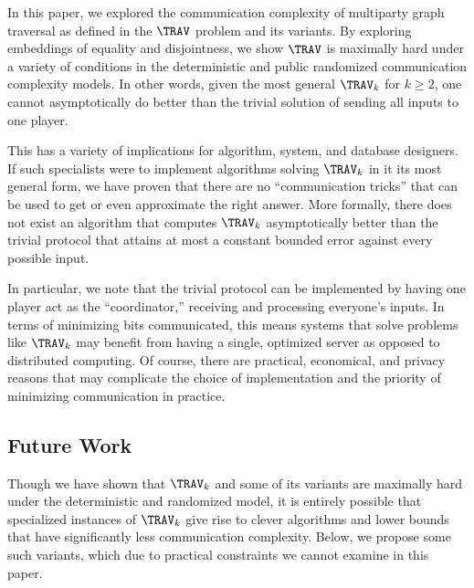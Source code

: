 In this paper, we explored the communication complexity of multiparty graph traversal as defined in the $\TRAV$ problem and its variants. By exploring embeddings of equality and disjointness, we show $\TRAV$ is maximally hard under a variety of conditions in the deterministic and public randomized communication complexity models. In other words, given the most general $\TRAV_k$ for $k \geq 2$, one cannot asymptotically do better than the trivial solution of sending all inputs to one player.

This has a variety of implications for algorithm, system, and database designers. If such specialists were to implement algorithms solving $\TRAV_k$ in it its most general form, we have proven that there are no ``communication tricks'' that can be used to get or even approximate the right answer. More formally, there does not exist an algorithm that computes $\TRAV_k$ asymptotically better than the trivial protocol that attains at most a constant bounded error against every possible input.

In particular, we note that the trivial protocol can be implemented by having one player act as the ``coordinator,'' receiving and processing everyone's inputs. In terms of minimizing bits communicated, this means systems that solve problems like $\TRAV_k$ may benefit from having a single, optimized server as opposed to distributed computing. Of course, there are practical, economical, and privacy reasons that may complicate the choice of implementation and the priority of minimizing communication in practice.

\subsection{Future Work}

Though we have shown that $\TRAV_k$ and some of its variants are maximally hard under the deterministic and randomized model, it is entirely possible that specialized instances of $\TRAV_k$ give rise to clever algorithms and lower bounds that have significantly less communication complexity. Below, we propose some such variants, which due to practical constraints we cannot examine in this paper.

